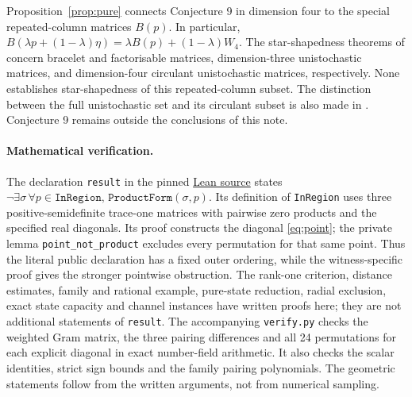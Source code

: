 \documentclass[11pt]{article}
\begin{document}
Proposition~\ref{prop:pure} connects Conjecture 9 in dimension four to
the special repeated-column matrices $B(p)$. In particular,
$B(\lambda p+(1-\lambda)\eta)=\lambda B(p)+(1-\lambda)W_4$.
The star-shapedness theorems of \cite[Theorem 14, Corollary 16,
Theorem 17]{RMKPZ} concern bracelet and factorisable matrices,
dimension-three unistochastic matrices, and dimension-four circulant
unistochastic matrices, respectively. None establishes star-shapedness
of this repeated-column subset. The distinction between the full
unistochastic set and its circulant subset is also made in
\cite[Section 4.3]{Salazar}. Conjecture 9 remains outside the conclusions
of this note.

\paragraph{Mathematical verification.}
The declaration \texttt{result} in the pinned
\href{https://github.com/the-omega-institute/trureturing/blob/73ec20a01fc35e0f53bc258c605821728f3c33b6/D5/S3/Quantum/Measurements/ThreeDistinguishabilityProductRefutation.lean}{Lean source}
states $\neg\exists\sigma\,\forall p\in\texttt{InRegion},\,
\texttt{ProductForm}(\sigma,p)$. Its definition of \texttt{InRegion}
uses three positive-semidefinite trace-one matrices with pairwise zero products
and the specified real diagonals. Its proof constructs the diagonal
\eqref{eq:point}; the private lemma \texttt{point\_not\_product} excludes
every permutation for that same point. Thus the literal public declaration
has a fixed outer ordering, while the witness-specific proof gives the stronger
pointwise obstruction. The rank-one criterion, distance estimates, family
and rational example, pure-state reduction, radial exclusion,
exact state capacity and channel instances have written
proofs here; they are not additional statements of \texttt{result}.
The accompanying \texttt{verify.py} checks the weighted Gram matrix,
the three pairing differences and all 24 permutations for each explicit
diagonal in exact number-field arithmetic. It also checks the scalar identities,
strict sign bounds and the family pairing polynomials.
The geometric statements follow from the written arguments,
not from numerical sampling.
\end{document}

